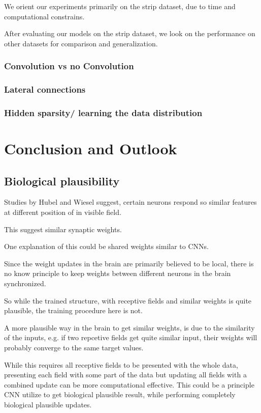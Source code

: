 We orient our experiments primarily on the strip dataset, due to time and computational constrains.

After evaluating our models on the strip dataset, we look on the performance on other datasets for comparison and generalization.     

\subsection{Convolution vs no Convolution}

\subsection{Lateral connections}

\subsection{Hidden sparsity/ learning the data distribution}


\chapter{Conclusion and Outlook}

\section{Biological plausibility}

Studies by Hubel and Wiesel suggest, certain neurons respond so similar features at different position of in visible field.

This suggest similar synaptic weights. 

One explanation of this could be shared weights similar to CNNs. 

Since the weight updates in the brain are primarily believed to be local, there is no know principle to keep weights between different neurons in the brain synchronized.

So while the trained structure, with receptive fields and similar weights is quite plausible, the training procedure here is not.

A more plausible way in the brain to get similar weights, is due to the similarity of the inputs, e.g. if two repcetive fields get quite similar input, their weights will probably converge to the same target values.  

While this requires all receptive fields to be presented with the whole data, presenting each field with some part of the data but updating all fields with a combined update can be more computational effective. 
This could be a principle CNN utilize to get biological plausible result, while performing completely biological plausible updates.

